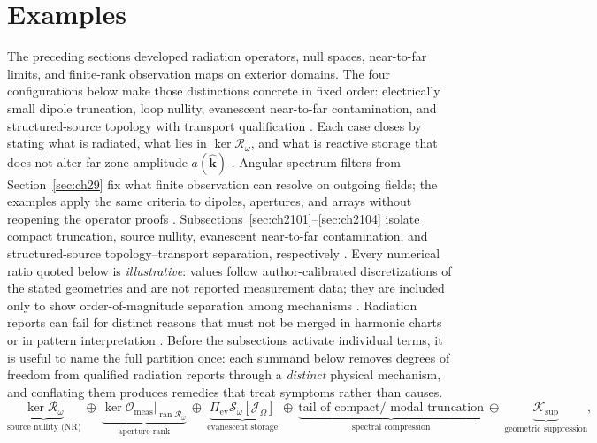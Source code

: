 \section{Examples}
\label{sec:ch210}
The preceding sections developed radiation operators, null spaces, near-to-far limits, and
finite-rank observation maps on exterior domains. The four configurations below make those
distinctions concrete in fixed order: electrically small dipole truncation, loop nullity,
evanescent near-to-far contamination, and structured-source topology with transport
qualification \cite{stratton1941,harrington2001,devaney2004}. Each case closes by stating what
is radiated, what lies in $\ker\mathcal{R}_\omega$, and what is reactive storage that does not
alter far-zone amplitude $a(\widehat{\mathbf{k}})$ \cite{chu1948,poynting1884}.
Angular-spectrum filters from Section~\ref{sec:ch29} fix what finite observation can resolve on
outgoing fields; the examples apply the same criteria to dipoles, apertures, and arrays without
reopening the operator proofs \cite{stratton1941,collin2001}.
Subsections~\ref{sec:ch2101}--\ref{sec:ch2104} isolate compact truncation, source nullity,
evanescent near-to-far contamination, and structured-source topology--transport separation,
respectively \cite{stratton1941}. Every numerical ratio
quoted below is \emph{illustrative}: values follow author-calibrated discretizations of the stated
geometries and are not reported measurement data; they are included only to show order-of-magnitude
separation among mechanisms \cite{hansen1988}. Radiation reports can fail for distinct reasons
that must not be merged in harmonic charts or in pattern interpretation \cite{marengo2000}. Before
the subsections activate individual terms, it is
useful to name the full partition once: each summand below removes degrees of freedom from
qualified radiation reports through a \emph{distinct} physical mechanism, and conflating them
produces remedies that treat symptoms rather than causes.
\begin{equation}
\label{eq:ch2.dof-partition-master}
\underbrace{\ker\mathcal{R}_\omega}_{\text{source nullity (NR)}}
\ \oplus\
\underbrace{\ker\mathcal{O}_{\mathrm{meas}}\big|_{\operatorname{ran}\mathcal{R}_\omega}}_{\text{aperture rank}}
\ \oplus\
\underbrace{\Pi_{\mathrm{ev}}\mathcal{S}_\omega[\mathcal{J}_\Omega]}_{\text{evanescent storage}}
\ \oplus\
\underbrace{\text{tail of compact/ modal truncation}}_{\text{spectral compression}}
\ \oplus\
\underbrace{\mathcal{K}_{\mathrm{sup}}}_{\text{geometric suppression}},
\end{equation}
